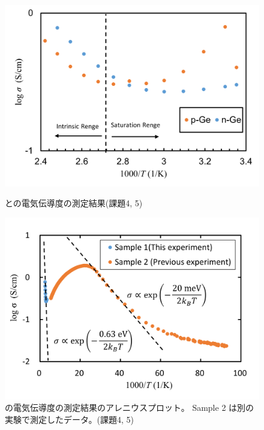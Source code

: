 \documentclass[11pt,dvipdfmx,a4paper]{jsarticle}
\numberwithin{equation}{section}
\begin{document}
\begin{figure}[H]
	\begin{minipage}[t]{0.45\columnwidth}
		\centering
		\includegraphics[width=\columnwidth]{graph/graph09.png}
		\caption{\small{との電気伝導度の測定結果(課題4, 5)}}
		\label{graph:09}
	\end{minipage}
	\hfil
	\begin{minipage}[t]{0.45\columnwidth}
		\centering
		\includegraphics[width=\columnwidth]{graph/graph06.png}
		\caption{\small{の電気伝導度の測定結果のアレニウスプロット。
		Sample 2 は別の実験で測定したデータ。(課題4, 5)}}
		\label{graph:06}
	\end{minipage}
\end{figure}
\end{document}
